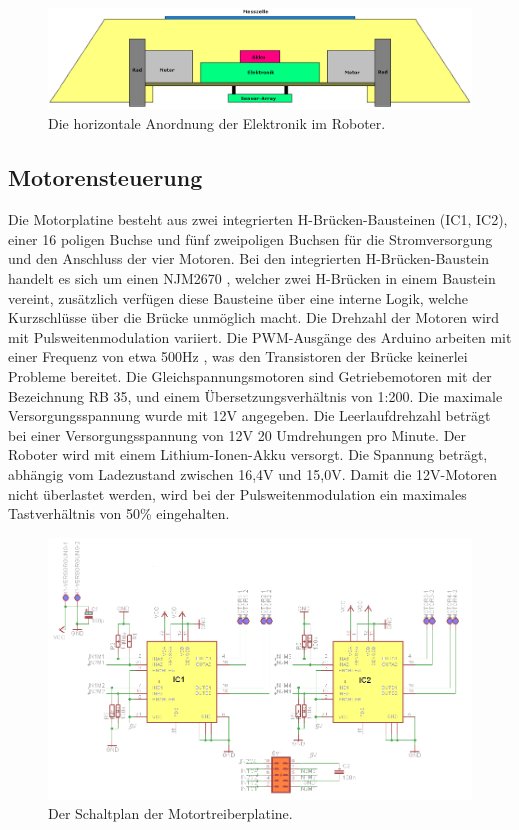 \documentclass[a4paper,bibtotoc,oneside]{scrbook}
\begin{document}
\begin{figure}[htbp]
\centering
\includegraphics[width=150mm]{img/vorne.png}
\caption{Die horizontale Anordnung der Elektronik im Roboter.}\label{vorne}
\end{figure}

\FloatBarrier
 
\subsection{Motorensteuerung}\thispagestyle{empty}

Die Motorplatine besteht aus zwei integrierten H-Brücken-Bausteinen (IC1, IC2), einer 16 poligen Buchse und fünf zweipoligen Buchsen für die Stromversorgung und den Anschluss der vier Motoren. Bei den integrierten H-Brücken-Baustein handelt es sich um einen NJM2670 \cite{njm}, welcher zwei H-Brücken in einem Baustein vereint, zusätzlich verfügen diese Bausteine über eine interne Logik, welche Kurzschlüsse über die Brücke unmöglich macht.
Die Drehzahl der Motoren wird mit Pulsweitenmodulation variiert. Die PWM-Ausgänge des Arduino arbeiten mit einer Frequenz von etwa 500Hz \cite{pwm}, was den Transistoren der Brücke keinerlei Probleme bereitet.
Die Gleichspannungsmotoren sind Getriebemotoren mit der Bezeichnung RB 35, und einem Übersetzungsverhältnis von 1:200. Die maximale Versorgungsspannung wurde mit 12V angegeben. Die Leerlaufdrehzahl beträgt bei einer Versorgungsspannung von 12V 20 Umdrehungen pro Minute.
Der Roboter wird mit einem Lithium-Ionen-Akku versorgt. Die Spannung beträgt, abhängig vom Ladezustand zwischen 16,4V und 15,0V. Damit die 12V-Motoren nicht überlastet werden, wird bei der Pulsweitenmodulation ein maximales Tastverhältnis von 50\% eingehalten.

\begin{figure}[htbp]
\centering
\includegraphics[width=150mm]{img/HBrucke.png}
\caption{Der Schaltplan der Motortreiberplatine.}\label{hbridge1}
\end{figure}
\end{document}
